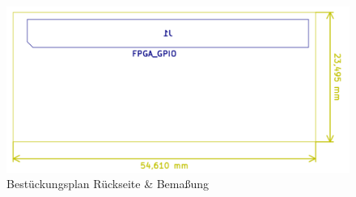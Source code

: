 \begin{figure}[H]
\begin{center}
\includegraphics[width = 15cm]{SAUER/Grafiken/Prot1/BFAB.png}
\caption{Bestückungsplan Rückseite \& Bemaßung}
\label{Prot1_BFAB}
\end{center}
\end{figure}
